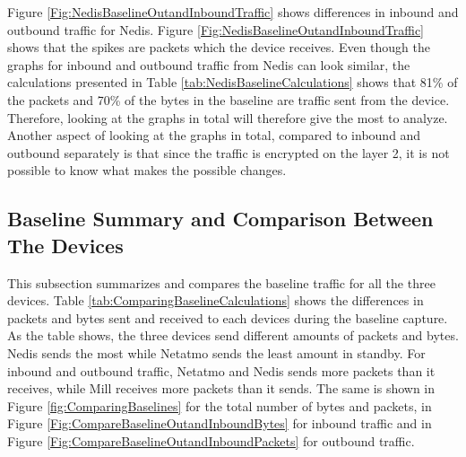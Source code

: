 Figure \ref{Fig:NedisBaselineOutandInboundTraffic} shows differences in inbound and outbound traffic for Nedis. Figure \ref{Fig:NedisBaselineOutandInboundTraffic} shows that the spikes are packets which the device receives. Even though the graphs for inbound and outbound traffic from Nedis can look similar, the calculations presented in Table \ref{tab:NedisBaselineCalculations} shows that 81\% of the packets and 70\% of the bytes in the baseline are traffic sent from the device. Therefore, looking at the graphs in total will therefore give the most to analyze. Another aspect of looking at the graphs in total, compared to inbound and outbound separately is that since the traffic is encrypted on the layer 2, it is not possible to know what makes the possible changes. 

\subsection{Baseline Summary and Comparison Between The Devices}
This subsection summarizes and compares the baseline traffic for all the three devices. Table \ref{tab:ComparingBaselineCalculations} shows the differences in packets and bytes sent and received to each devices during the baseline capture. As the table shows, the three devices send different amounts of packets and bytes. Nedis sends the most while Netatmo sends the least amount in standby. For inbound and outbound traffic, Netatmo and Nedis sends more packets than it receives, while Mill receives more packets than it sends. The same is shown in Figure \ref{fig:ComparingBaselines} for the total number of bytes and packets, in Figure \ref{Fig:CompareBaselineOutandInboundBytes} for inbound traffic and in Figure \ref{Fig:CompareBaselineOutandInboundPackets} for outbound traffic.

